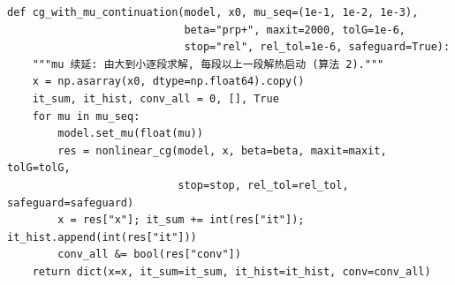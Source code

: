 \documentclass[withoutpreface,bwprint]{cumcmthesis}
\begin{document}
\begin{lstlisting}[style=appcode]
def cg_with_mu_continuation(model, x0, mu_seq=(1e-1, 1e-2, 1e-3),
                            beta="prp+", maxit=2000, tolG=1e-6,
                            stop="rel", rel_tol=1e-6, safeguard=True):
    """mu 续延: 由大到小逐段求解, 每段以上一段解热启动 (算法 2)."""
    x = np.asarray(x0, dtype=np.float64).copy()
    it_sum, it_hist, conv_all = 0, [], True
    for mu in mu_seq:
        model.set_mu(float(mu))
        res = nonlinear_cg(model, x, beta=beta, maxit=maxit, tolG=tolG,
                           stop=stop, rel_tol=rel_tol, safeguard=safeguard)
        x = res["x"]; it_sum += int(res["it"]); it_hist.append(int(res["it"]))
        conv_all &= bool(res["conv"])
    return dict(x=x, it_sum=it_sum, it_hist=it_hist, conv=conv_all)
\end{lstlisting}
\end{document}

